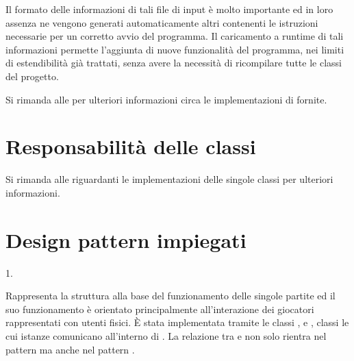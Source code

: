 \documentclass[letterpaper,10pt,italian,openany,oneside]{sphinxmanual}
\begin{document}
\noindent{}

\noindent{}

Il formato delle informazioni di tali file di input è molto importante ed in loro assenza ne vengono generati automaticamente altri
 contenenti le istruzioni necessarie per un corretto avvio del programma.
Il caricamento a runtime di tali informazioni permette l’aggiunta di nuove funzionalità del programma, nei limiti di estendibilità già trattati, senza avere la
necessità di ricompilare tutte le classi del progetto.

Si rimanda alle {\hyperref[\detokenize{source/packages::doc}]{}} per ulteriori informazioni circa le implementazioni di  fornite.


\section{Responsabilità delle classi}
\label{\detokenize{introduzione:responsabilita-delle-classi}}
Si rimanda alle {\hyperref[\detokenize{source/packages::doc}]{}} riguardanti le implementazioni delle singole classi per ulteriori informazioni.


\section{Design pattern impiegati}
\label{\detokenize{introduzione:design-pattern-impiegati}}
1.  %
\begin{footnote}[2]\sphinxAtStartFootnote
{}
%
\end{footnote}
Rappresenta la struttura alla base del funzionamento delle singole partite ed il suo funzionamento è orientato principalmente all’interazione dei giocatori rappresentati con utenti fisici.
È stata implementata tramite le classi ,  e , classi le cui istanze comunicano all’interno di .
La relazione tra  e  non solo rientra nel pattern  ma anche nel pattern .
\end{document}
